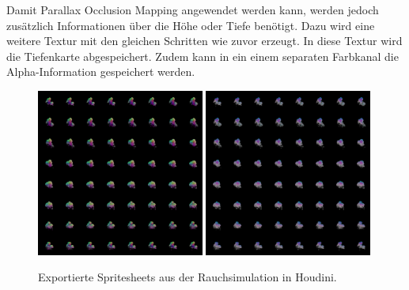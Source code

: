 Damit Parallax Occlusion Mapping angewendet werden kann, werden jedoch zusätzlich Informationen über die Höhe oder Tiefe benötigt.
Dazu wird eine weitere Textur mit den gleichen Schritten wie zuvor erzeugt. In diese Textur wird die Tiefenkarte abgespeichert. Zudem kann in ein einem separaten
Farbkanal die Alpha-Information gespeichert werden.


\begin{figure}[hb]
	\centering
	\includegraphics[width=0.49\textwidth]{Grafiken/Implementation/Lightmaps/smokeSim_T1.png}
	\includegraphics[width=0.49\textwidth]{Grafiken/Implementation/Lightmaps/smokeSim_T2.png}
	\begin{footnotesize}
		\caption{Exportierte Spritesheets aus der Rauchsimulation in Houdini. }
		\label{fig:flipbook}
	\end{footnotesize}
\end{figure}


